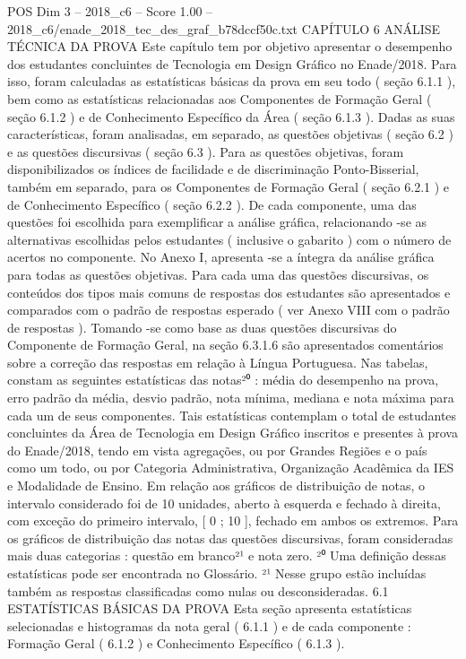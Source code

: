 \begin{textsample}{POS Dim 3 – 2018\_c6 – Score 1.00 – 2018\_c6/enade\_2018\_tec\_des\_graf\_b78dccf50c.txt}  \label{ex:f3_pos_120}
CAPÍTULO 6 ANÁLISE TÉCNICA DA PROVA Este capítulo tem por objetivo apresentar o desempenho dos estudantes concluintes de Tecnologia em Design Gráfico no Enade/2018.
Para isso, foram calculadas as estatísticas básicas da prova em seu todo ( seção 6.1.1 ), bem como as estatísticas relacionadas aos Componentes de Formação Geral ( seção 6.1.2 ) e de Conhecimento Específico da Área ( seção 6.1.3 ).
Dadas as suas características, foram analisadas, em separado, as questões objetivas ( seção 6.2 ) e as questões discursivas ( seção 6.3 ).
Para as questões objetivas, foram disponibilizados os índices de facilidade e de discriminação Ponto-Bisserial, também em separado, para os Componentes de Formação Geral ( seção 6.2.1 ) e de Conhecimento Específico ( seção 6.2.2 ).
De cada componente, uma das questões foi escolhida para exemplificar a análise gráfica, relacionando -se as alternativas escolhidas pelos estudantes ( inclusive o gabarito ) com o número de acertos no componente.
No Anexo I, apresenta -se a íntegra da análise gráfica para todas as questões objetivas.
Para cada uma das questões discursivas, os conteúdos dos tipos mais comuns de respostas dos estudantes são apresentados e comparados com o padrão de respostas esperado ( ver Anexo VIII com o padrão de respostas ).
Tomando -se como base as duas questões discursivas do Componente de Formação Geral, na seção 6.3.1.6 são apresentados comentários sobre a correção das respostas em relação à Língua Portuguesa.
Nas tabelas, constam as seguintes estatísticas das notas²⁰ : média do desempenho na prova, erro padrão da média, desvio padrão, nota mínima, mediana e nota máxima para cada um de seus componentes.
Tais estatísticas contemplam o total de estudantes concluintes da Área de Tecnologia em Design Gráfico inscritos e presentes à prova do Enade/2018, tendo em vista agregações, ou por Grandes Regiões e o país como um todo, ou por Categoria Administrativa, Organização Acadêmica da IES e Modalidade de Ensino.
Em relação aos gráficos de distribuição de notas, o intervalo considerado foi de 10 unidades, aberto à esquerda e fechado à direita, com exceção do primeiro intervalo, [ 0 ; 10 ], fechado em ambos os extremos.
Para os gráficos de distribuição das notas das questões discursivas, foram consideradas mais duas categorias : questão em branco²¹ e nota zero. ²⁰ Uma definição dessas estatísticas pode ser encontrada no Glossário. ²¹ Nesse grupo estão incluídas também as respostas classificadas como nulas ou desconsideradas. 6.1 ESTATÍSTICAS BÁSICAS DA PROVA Esta seção apresenta estatísticas selecionadas e histogramas da nota geral ( 6.1.1 ) e de cada componente : Formação Geral ( 6.1.2 ) e Conhecimento Específico ( 6.1.3 ).

\end{textsample}
